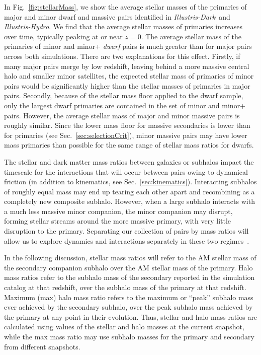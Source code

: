 \documentclass[twocolumn]{aastex63}
\newcommand\ID{\textit{Illustris-Dark}}
\newcommand\IH{\textit{Illustris-Hydro}}
\begin{document}
In Fig.~\ref{fig:stellarMass}, we show the average stellar masses of the primaries of major and minor dwarf and massive pairs identified in \ID\ and \IH. We find that the average stellar masses of primaries increases over time, typically peaking at or near $z=0$. The average stellar mass of the primaries of minor and minor+ \textit{dwarf} pairs is much greater than for major pairs across both simulations. There are two explanations for this effect. Firstly, if many major pairs merge by low redshift, leaving behind a more massive central halo and smaller minor satellites, the expected stellar mass of primaries of minor pairs would be significantly higher than the stellar masses of primaries in major pairs. Secondly, because of the stellar mass floor applied to the dwarf sample, only the largest dwarf primaries are contained in the set of minor and minor+ pairs. %
However, the average stellar mass of major and minor massive pairs is roughly similar. Since the lower mass floor for massive secondaries is lower than for primaries (see Sec.~\ref{sec:selectionCrit}), minor massive pairs may have lower mass primaries than possible for the same range of stellar mass ratios for dwarfs.

The stellar and dark matter mass ratios between galaxies or subhalos impact the timescale for the interactions that will occur between pairs owing to dynamical friction (in addition to kinematics, see Sec.~\ref{sec:kinematics}). Interacting subhalos of roughly equal mass may end up tearing each other apart and recombining as a completely new composite subhalo. However, when a large subhalo interacts with a much less massive minor companion, the minor companion may disrupt, forming stellar streams around the more massive primary, with very little disruption to the primary. Separating our collection of pairs by mass ratios will allow us to explore dynamics and interactions separately in these two regimes~\citep{cox08}.

In the following discussion, stellar mass ratios will refer to the AM stellar mass of the secondary companion subhalo over the AM stellar mass of the primary. Halo mass ratios refer to the subhalo mass of the secondary reported in the simulation catalog at that redshift, over the subhalo mass of the primary at that redshift. Maximum (max) halo mass ratio refers to the maximum or ``peak'' subhalo mass ever achieved by the secondary subhalo, over the peak subhalo mass achieved by the primary at any point in their evolution. Thus, stellar and halo mass ratios are calculated using values of the stellar and halo masses at the current snapshot, while the max mass ratio may use subhalo masses for the primary and secondary from different snapshots.
\end{document}
